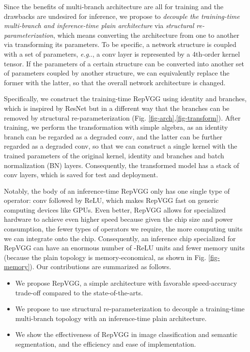 \documentclass[final]{cvpr}
\makeatletter
\DeclareRobustCommand\onedot{\futurelet\@let@token\@onedot}
\def\@onedot{\ifx\@let@token.\else.\null\fi\xspace}
\def\eg{\emph{e.g}\onedot}
\makeatother
\begin{document}
Since the benefits of multi-branch architecture are all for training and the drawbacks are undesired for inference, we propose to \textit{decouple the training-time multi-branch and inference-time plain architecture} via \textit{structural re-parameterization}, which means converting the architecture from one to another via transforming its parameters. To be specific, a network structure is coupled with a set of parameters, \eg, a conv layer is represented by a 4th-order kernel tensor. If the parameters of a certain structure can be converted into another set of parameters coupled by another structure, we can equivalently replace the former with the latter, so that the overall network architecture is changed. 


Specifically, we construct the training-time RepVGG using identity and  branches, which is inspired by ResNet but in a different way that the branches can be removed by structural re-parameterization (Fig. \ref{fig-arch},\ref{fig-transform}). After training, we perform the transformation with simple algebra, as an identity branch can be regarded as a degraded  conv, and the latter can be further regarded as a degraded  conv, so that we can construct a single  kernel with the trained parameters of the original  kernel, identity and  branches and batch normalization (BN) \cite{ioffe2015batch} layers. Consequently, the transformed model has a stack of  conv layers, which is saved for test and deployment. 

Notably, the body of an inference-time RepVGG only has one single type of operator:  conv followed by ReLU, which makes RepVGG fast on generic computing devices like GPUs. Even better, RepVGG allows for specialized hardware to achieve even higher speed because given the chip size and power consumption, the fewer types of operators we require, the more computing units we can integrate onto the chip. Consequently, an inference chip specialized for RepVGG can have an enormous number of -ReLU units and fewer memory units (because the plain topology is memory-economical, as shown in Fig. \ref{fig-memory}). Our contributions are summarized as follows.
\begin{itemize}[noitemsep,nolistsep,topsep=0pt,parsep=0pt,partopsep=0pt]
	\item We propose RepVGG, a simple architecture with favorable speed-accuracy trade-off compared to the state-of-the-arts.
	\item We propose to use structural re-parameterization to decouple a training-time multi-branch topology with an inference-time plain architecture.
	\item We show the effectiveness of RepVGG in image classification and semantic segmentation, and the efficiency and ease of implementation.
\end{itemize}
\end{document}

